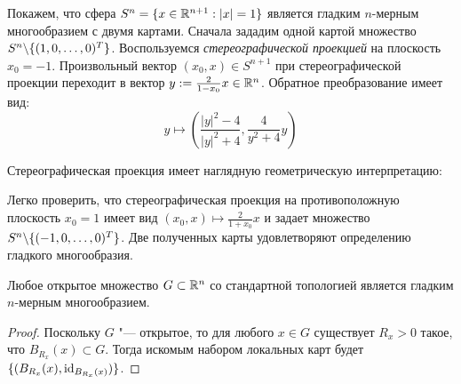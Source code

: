 \begin{example}
	Покажем, что сфера $S^n = \{x \in \mathbb{R}^{n+1} : |x| = 1\}$ является гладким $n$-мерным многообразием с двумя картами. Сначала зададим одной картой множество $S^n \backslash \{(1, 0, \dotsc, 0)^T\}$. Воспользуемся \textit{стереографической проекцией} на плоскость $x_0 = -1$. Произвольный вектор $(x_0, x) \in S^{n+1}$ при стереографической проекции переходит в вектор $y := \frac{2}{1-x_0}x \in \mathbb{R}^n$. Обратное преобразование имеет вид:
	\[y \mapsto \left(\frac{|y|^2 - 4}{|y|^2 + 4}, \frac{4}{y^2 + 4}y\right)\]
	
	Стереографическая проекция имеет наглядную геометрическую интерпретацию:
	\begin{center}
	\end{center}
	
	Легко проверить, что стереографическая проекция на противоположную плоскость $x_0 = 1$ имеет вид $(x_0, x) \mapsto \frac2{1+x_0}x$ и задает множество $S^n \backslash \{(-1, 0, \dotsc, 0)^T\}$. Две полученных карты удовлетворяют определению гладкого многообразия.
\end{example}

\begin{proposition}
	Любое открытое множество $G \subset \mathbb{R}^n$ со стандартной топологией является гладким $n$-мерным многообразием.
\end{proposition}

\begin{proof}
	Поскольку $G$ "--- открытое, то для любого $x \in G$ существует $R_x > 0$ такое, что $B_{R_x}(x) \subset G$. Тогда искомым набором локальных карт будет $\{(B_{R_x}(x), \mathrm{id}_{B_{R_x}(x)})\}$.
\end{proof}

